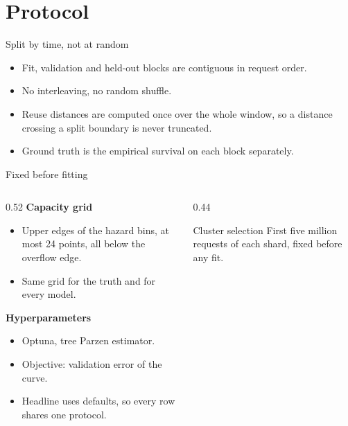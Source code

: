 \section{Protocol}

\begin{frame}{Split by time, not at random}
  \begin{itemize}
    \item Fit, validation and held-out blocks are contiguous in request order.
    \item No interleaving, no random shuffle.
    \item Reuse distances are computed once over the whole window, so a
      distance crossing a split boundary is never truncated.
    \item Ground truth is the empirical survival on each block separately.
  \end{itemize}
\end{frame}

\begin{frame}{Fixed before fitting}
  \begin{columns}[T,onlytextwidth]
    \begin{column}{0.52\textwidth}
      \textbf{Capacity grid}
      \begin{itemize}
        \item Upper edges of the hazard bins, at most 24 points, all below the
          overflow edge.
        \item Same grid for the truth and for every model.
      \end{itemize}
      \vspace{0.5em}
      \textbf{Hyperparameters}
      \begin{itemize}
        \item Optuna, tree Parzen estimator.
        \item Objective: validation error of the curve.
        \item Headline uses defaults, so every row shares one protocol.
      \end{itemize}
    \end{column}
    \begin{column}{0.44\textwidth}
      \begin{block}{Cluster selection}
        First five million requests of each shard, fixed before any fit.
      \end{block}
    \end{column}
  \end{columns}
\end{frame}
